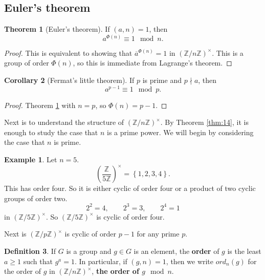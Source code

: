 \documentclass{article}
\newcommand{\Z}{\mathbb{Z}}
\newcommand{\rb}[1]{\left( #1 \right)}
\newcommand{\cb}[1]{\left\{ #1 \right\}}
\newcommand{\Unit}[1]{\rb{\dfrac{\Z}{#1\Z}}^\times}
\newcommand{\unit}[1]{\rb{\Z / #1\Z}^\times}
\theoremstyle{definition}\newtheorem{definition}{Definition}
\theoremstyle{definition}\newtheorem{remark}[definition]{Remark}
\theoremstyle{definition}\newtheorem*{example}{Example}
\theoremstyle{definition}\newtheorem*{note}{Note}
\newtheorem{theorem}[definition]{Theorem}
\newtheorem{corollary}[definition]{Corollary}
\begin{document}
\subsection{Euler's theorem}

\begin{theorem}[Euler's theorem]
\label{thm:16}
If $ \rb{a, n} = 1 $, then
$$ a^{\Phi\rb{n}} \equiv 1 \mod n. $$
\end{theorem}

\begin{proof}
This is equivalent to showing that $ \overline{a}^{\Phi\rb{n}} = 1 $ in $ \unit{n} $. This is a group of order $ \Phi\rb{n} $, so this is immediate from Lagrange's theorem.
\end{proof}

\begin{corollary}[Fermat's little theorem]
If $ p $ is prime and $ p \nmid a $, then
$$ a^{p - 1} \equiv 1 \mod p. $$
\end{corollary}

\begin{proof}
Theorem \ref{thm:16} with $ n = p $, so $ \Phi\rb{n} = p - 1 $.
\end{proof}

Next is to understand the structure of $ \unit{n} $. By Theorem \ref{thm:14}, it is enough to study the case that $ n $ is a prime power. We will begin by considering the case that $ n $ is prime.

\begin{example}
Let $ n = 5 $.
$$ \Unit{5} = \cb{1, 2, 3, 4}. $$
This has order four. So it is either cyclic of order four or a product of two cyclic groups of order two.
$$ 2^2 = 4, \qquad 2^3 = 3, \qquad 2^4 = 1 $$
in $ \unit{5} $. So $ \unit{5} $ is cyclic of order four.
\end{example}

Next is $ \unit{p} $ is cyclic of order $ p - 1 $ for any prime $ p $.


\begin{definition}
If $ G $ is a group and $ g \in G $ is an element, the \textbf{order} of $ g $ is the least $ a \ge 1 $ such that $ g^a = 1 $. In particular, if $ \rb{g, n} = 1 $, then we write $ ord_n\rb{g} $ for the order of $ g $ in $ \unit{n} $, \textbf{the order of $ g \mod n $}.
\end{definition}
\end{document}
